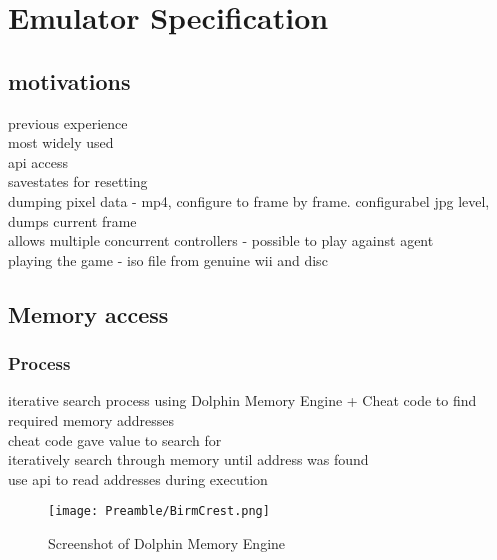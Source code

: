 
\chapter{Emulator Specification}
\section{motivations}
\cite{DolphinEmulator}
previous experience\\ 
most widely used\\
api access\cite{DolphinWithScriptingSupport}\\
savestates for resetting\\
dumping pixel data - mp4, configure to frame by frame. configurabel jpg level, dumps current frame\\
allows multiple concurrent controllers - possible to play against agent\\
playing the game - iso file from genuine wii and disc

\section{Memory access}
\subsection{Process}
iterative search process using Dolphin Memory Engine + Cheat code to find required memory addresses \cite{DolhpinMemoryEngine}
\\cheat code gave value to search for
\\ iteratively search through memory until address was found 
\\ use api to read addresses during execution
\begin{figure}
    \centering
    \texttt{[image: Preamble/BirmCrest.png]}
    \caption{Screenshot of Dolphin Memory Engine}
    \label{fig:dme}
\end{figure}

